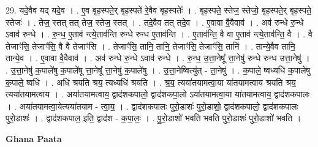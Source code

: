 \documentclass[17pt]{extarticle}
\begin{document}
29. यदे॒वैव यद् यदे॒व । . ए॒व बृह॒स्पते॒र् बृह॒स्पते॑ रे॒वैव बृह॒स्पतेः᳚ । . बृह॒स्पते॒ स्तेज॒ स्तेजो॒ बृह॒स्पते॒र् बृह॒स्पते॒ स्तेजः॑ । . तेज॒ स्तत् तत् तेज॒ स्तेज॒ स्तत् । . तदे॒वैव तत् तदे॒व । . ए॒वावा वै॒वैवाव॑ । . अव॑ रुन्धे रु॒न्धे ऽवाव॑ रुन्धे । . रु॒न्ध॒ ए॒ताव॑ न्त्ये॒ताव॑न्ति रुन्धे रुन्ध ए॒ताव॑न्ति । . ए॒ताव॑न्ति॒ वै वा ए॒ताव॑ न्त्ये॒ताव॑न्ति॒ वै । . वै तेजाꣳ॑सि॒ तेजाꣳ॑सि॒ वै वै तेजाꣳ॑सि । . तेजाꣳ॑सि॒ तानि॒ तानि॒ तेजाꣳ॑सि॒ तेजाꣳ॑सि॒ तानि॑ । . तान्ये॒वैव तानि॒ तान्ये॒व । . ए॒वावा वै॒वैवाव॑ । . अव॑ रुन्धे रु॒न्धे ऽवाव॑ रुन्धे । . रु॒न्ध॒ उ॒त्ता॒नेषू᳚ त्ता॒नेषु॑ रुन्धे रुन्ध उत्ता॒नेषु॑ । . उ॒त्ता॒नेषु॑ क॒पाले॑षु क॒पाले॑षू त्ता॒नेषू᳚ त्ता॒नेषु॑ क॒पाले॑षु । . उ॒त्ता॒नेष्वित्यु॑त् - ता॒नेषु॑ । . क॒पाले॒ ष्वध्यधि॑ क॒पाले॑षु क॒पाले॒ ष्वधि॑ । . अधि॑ श्रयति श्रय॒ त्यध्यधि॑ श्रयति । . श्र॒य॒ त्यया॑तयामत्वा॒या या॑तयामत्वाय श्रयति श्रय॒ त्यया॑तयामत्वाय । . अया॑तयामत्वाय॒ द्वाद॑शकपालो॒ द्वाद॑शकपा॒लो ऽया॑तयामत्वा॒या या॑तयामत्वाय॒ द्वाद॑शकपालः । . अया॑तयामत्वा॒येत्यया॑तयाम - त्वा॒य॒ । . द्वाद॑शकपालः पुरो॒डाशः॑ पुरो॒डाशो॒ द्वाद॑शकपालो॒ द्वाद॑शकपालः पुरो॒डाशः॑ । . द्वाद॑शकपाल॒ इति॒ द्वाद॑श - क॒पा॒लः॒ । . पु॒रो॒डाशो॑ भवति भवति पुरो॒डाशः॑ पुरो॒डाशो॑ भवति । \newline

\textbf{Ghana Paata } \newline
\end{document}
